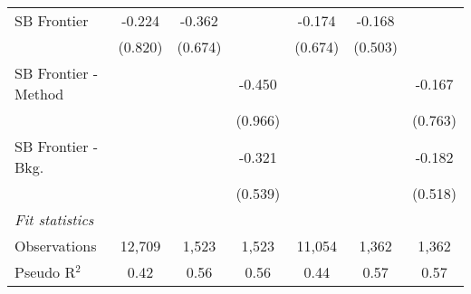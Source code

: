 \begin{tabular}{lcccccc}
   SB Frontier          & -0.224        & -0.362  &         & -0.174        & -0.168  &   \\   
                        & (0.820)       & (0.674) &         & (0.674)       & (0.503) &   \\   
   SB Frontier - Method &               &         & -0.450  &               &         & -0.167\\   
                        &               &         & (0.966) &               &         & (0.763)\\   
   SB Frontier - Bkg.   &               &         & -0.321  &               &         & -0.182\\   
                        &               &         & (0.539) &               &         & (0.518)\\   
   \midrule
   \emph{Fit statistics}\\
   Observations         & 12,709        & 1,523   & 1,523   & 11,054        & 1,362   & 1,362\\  
   Pseudo R$^2$         & 0.42          & 0.56    & 0.56    & 0.44          & 0.57    & 0.57\\  
   

\end{tabular}
